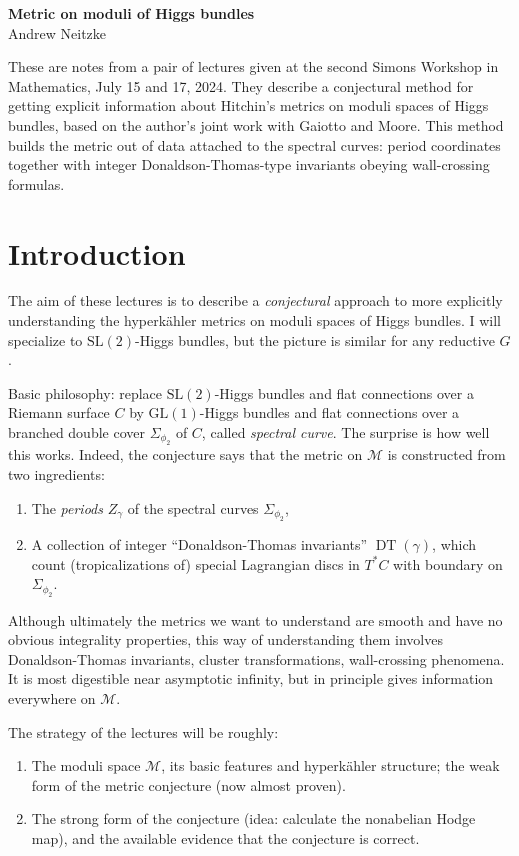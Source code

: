 \documentclass[12pt,letterpaper,reqno]{article}
\numberwithin{equation}{section}
\begin{document}
\begin{center}
\textbf{Metric on moduli of Higgs bundles} \\
Andrew Neitzke
\end{center}

{These are notes from a pair of lectures
given at the second Simons Workshop in Mathematics, July 15 and 17, 2024.
They describe a conjectural method for getting explicit information about
Hitchin's metrics on moduli spaces of Higgs bundles, based on the 
author's joint work with Gaiotto and Moore.
This method builds the metric out of data attached to the spectral curves: period coordinates together with integer Donaldson-Thomas-type invariants obeying wall-crossing formulas.}

\section{Introduction}

The aim of these lectures is to describe a \textit{conjectural} 
approach to more explicitly understanding the hyperk\"ahler metrics on 
moduli spaces of Higgs bundles. 
I will specialize to $\mathrm{SL}(2)$-Higgs bundles, but the
picture is similar for any reductive $G$.

Basic philosophy: replace $\mathrm{SL}(2)$-Higgs bundles and flat connections over a Riemann
surface $C$ by $\mathrm{GL}(1)$-Higgs bundles and flat connections over a branched double cover $\Sigma_{\phi_2}$
of $C$, called \textit{spectral curve}. The surprise is how well this 
works. Indeed, the conjecture says that the metric on $\mathcal M$
is constructed from two ingredients:
\begin{enumerate}
  \item The \textit{periods} $Z_\gamma$ of the spectral curves $\Sigma_{\phi_2}$,
  \item A collection of integer ``Donaldson-Thomas invariants''
  $\operatorname{DT}(\gamma)$,
  which count (tropicalizations of) special Lagrangian discs
  in $T^*C$ with boundary on $\Sigma_{\phi_2}$.
\end{enumerate}

Although ultimately the metrics we want to understand
are smooth and have no obvious integrality properties,
this way of understanding them involves Donaldson-Thomas
invariants, cluster transformations, 
wall-crossing phenomena.
It is most digestible near asymptotic infinity, but in principle
gives information everywhere on $\mathcal M$.

The strategy of the lectures will be roughly:
\begin{enumerate}
  \item The moduli space $\mathcal M$, its basic features and hyperk\"ahler structure; the weak form of the metric conjecture (now almost proven).
  \item The strong form of the conjecture (idea: calculate the nonabelian Hodge map), 
  and the available evidence that the conjecture is correct.
\end{enumerate}
\end{document}
